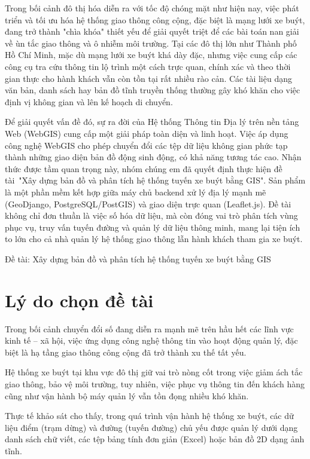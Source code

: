 \documentclass[13pt,a4paper]{report}
\begin{document}
Trong bối cảnh đô thị hóa diễn ra với tốc độ chóng mặt như hiện nay, việc phát triển và tối ưu hóa hệ thống giao thông công cộng, đặc biệt là mạng lưới xe buýt, đang trở thành "chìa khóa" thiết yếu để giải quyết triệt để các bài toán nan giải về ùn tắc giao thông và ô nhiễm môi trường. Tại các đô thị lớn như Thành phố Hồ Chí Minh, mặc dù mạng lưới xe buýt khá dày đặc, nhưng việc cung cấp các công cụ tra cứu thông tin lộ trình một cách trực quan, chính xác và theo thời gian thực cho hành khách vẫn còn tồn tại rất nhiều rào cản. Các tài liệu dạng văn bản, danh sách hay bản đồ tĩnh truyền thống thường gây khó khăn cho việc định vị không gian và lên kế hoạch di chuyển.

Để giải quyết vấn đề đó, sự ra đời của Hệ thống Thông tin Địa lý trên nền tảng Web (WebGIS) cung cấp một giải pháp toàn diện và linh hoạt. Việc áp dụng công nghệ WebGIS cho phép chuyển đổi các tệp dữ liệu không gian phức tạp thành những giao diện bản đồ động sinh động, có khả năng tương tác cao. Nhận thức được tầm quan trọng này, nhóm chúng em đã quyết định thực hiện đề tài "Xây dựng bản đồ và phân tích hệ thống tuyến xe buýt bằng GIS". Sản phẩm là một phần mềm kết hợp giữa máy chủ backend xử lý địa lý mạnh mẽ (GeoDjango, PostgreSQL/PostGIS) và giao diện trực quan (Leaflet.js). Đề tài không chỉ đơn thuần là việc số hóa dữ liệu, mà còn đóng vai trò phân tích vùng phục vụ, truy vấn tuyến đường và quản lý dữ liệu thông minh, mang lại tiện ích to lớn cho cả nhà quản lý hệ thống giao thông lẫn hành khách tham gia xe buýt.

Đề tài: Xây dựng bản đồ và phân tích hệ thống tuyến xe buýt bằng GIS

\section{Lý do chọn đề tài}

Trong bối cảnh chuyển đổi số đang diễn ra mạnh mẽ trên hầu hết các lĩnh vực kinh tế – xã hội, việc ứng dụng công nghệ thông tin vào hoạt động quản lý, đặc biệt là hạ tầng giao thông công cộng đã trở thành xu thế tất yếu.

Hệ thống xe buýt tại khu vực đô thị giữ vai trò nòng cốt trong việc giảm ách tắc giao thông, bảo vệ môi trường, tuy nhiên, việc phục vụ thông tin đến khách hàng cũng như vận hành bộ máy quản lý vẫn tồn đọng nhiều khó khăn.

Thực tế khảo sát cho thấy, trong quá trình vận hành hệ thống xe buýt, các dữ liệu điểm (trạm dừng) và đường (tuyến đường) chủ yếu được quản lý dưới dạng danh sách chữ viết, các tệp bảng tính đơn giản (Excel) hoặc bản đồ 2D dạng ảnh tĩnh.
\end{document}
